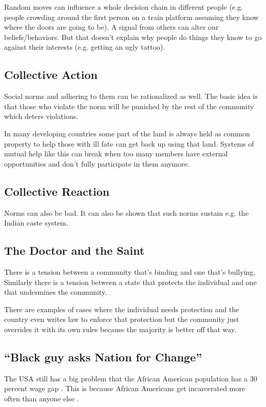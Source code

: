 \documentclass[a4paper, twocolumn]{article}
\begin{document}
Random moves can influence a whole decision chain in different people (e.g. people crowding around the first person on a train platform assuming they know where the doors are going to be). A signal from others can alter our beliefs/behaviors. But that doesn't explain why people do things they know to go against their interests (e.g. getting an ugly tattoo).

\subsection{Collective Action}
Social norms and adhering to them can be rationalized as well. The basic idea is that those who violate the norm will be punished by the rest of the community which deters violations. \cite{folk-theorem1} \cite{folk-theorem2}

In many developing countries some part of the land is always held as common property to help those with ill fate can get back up using that land. Systems of mutual help like this can break when too many members have external opportunities and don't fully participate in them anymore.

\subsection{Collective Reaction}
Norms can also be bad. It can also be shown that such norms sustain e.g. the Indian caste system. \cite{social-norms-behaviors-growth}

\subsection{The Doctor and the Saint}
There is a tension between a community that's binding and one that's bullying. Similarly there is a tension between a state that protects the individual and one that undermines the community.

There are examples of cases where the individual needs protection and the country even writes law to enforce that protection but the community just overrides it with its own rules because the majority is better off that way.

\subsection{``Black guy asks Nation for Change''}
The USA still has a big problem that the African American population has a 30 percent wage gap \cite{wage-gap-pewresearch}. This is because African Americans get incarcerated more often than anyone else \cite{incarceration-gap}.
\end{document}
